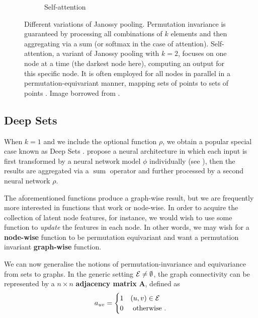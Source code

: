 \begin{figure}[th]
\begin{subfigure}[h]{0.46\textwidth}
		\vspace{-0.8cm}
		\caption{Self-attention}
		\label{fig:Janossy_K2Att}
	\end{subfigure} 
	\caption{Different variations of Janossy pooling. Permutation invariance is guaranteed by processing all combinations of $k$ elements and then aggregating via a sum (or softmax in the case of attention). Self-attention, a variant of Janossy pooling with $k=2$, focuses on one node at a time (the darkest node here), computing an output for this specific node. It is often employed for all nodes in parallel in a permutation-equivariant manner, mapping sets of points to sets of points \parencite{Lee2018}. Image borrowed from \textcite{wagstaff2022universal}.}
	\label{fig:k12}
\end{figure}

\subsection{Deep Sets}\label{ssec:deep-sets}

When $k=1$ and we include the optional function $\rho$, we obtain a popular special case known as Deep Sets \parencite{zaheer2017deep}. \citeauthor{zaheer2017deep} propose a neural architecture in which each input is first transformed by a neural network model $\phi$ individually (see ), then the results are aggregated via a $\operatorname{sum}$ operator and further processed by a second neural network $\rho$.

The aforementioned functions produce a  graph-wise result, but we are frequently more interested in functions that work  or node-wise. In order to acquire the collection of latent node features, for instance, we would wish to use some function to \textit{update} the features in each node. In other words, we may wish for a \textbf{node-wise} function to be permutation equivariant and want a permutation invariant \textbf{graph-wise} function.

We can now generalise the notions of permutation-invariance and equivariance from sets to graphs. In the generic setting $\mathcal{E} \neq \emptyset$, the graph connectivity can be represented by a $n \times n$ \textbf{adjacency matrix} $\symbf{A}$, defined as
\begin{equation}
    \label{eqn:adj-matrix-def}
    a_{u v}= \begin{cases}1 & (u, v) \in \mathcal{E} \\ 0 & \text { otherwise }.\end{cases}
\end{equation}

